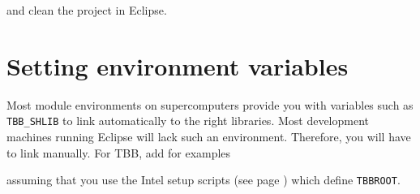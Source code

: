 \noindent
and clean the project in Eclipse.


\section{Setting environment variables}

Most module environments on supercomputers provide you with variables such as
\texttt{TBB\_SHLIB} to link automatically to the right libraries.
Most development machines running Eclipse will lack such an environment.
Therefore, you will have to link manually. 
For TBB, add for examples


assuming that you use the Intel setup scripts (see page
\pageref{label:supercomputer:Intel-scripts}) which define \texttt{TBBROOT}.









